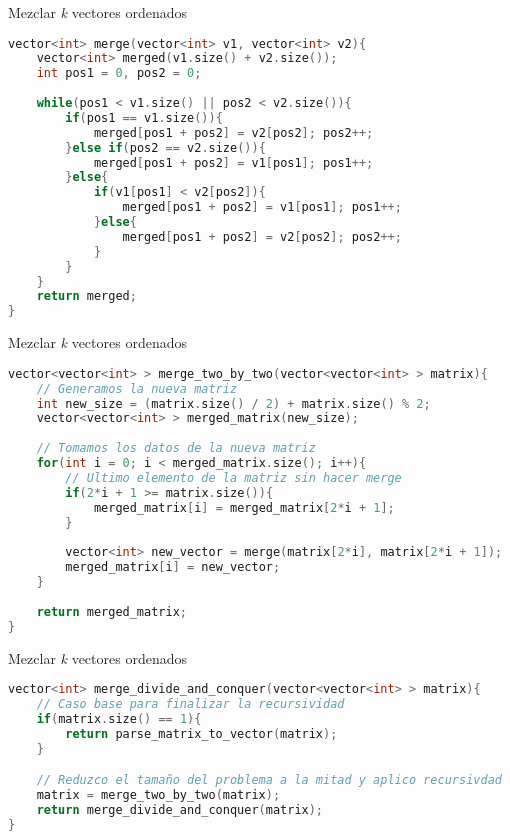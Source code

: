 \documentclass[10pt, xcolor=table]{beamer}
\begin{document}
\begin{frame}[fragile]{Mezclar \textit{k} vectores ordenados}
\begin{lstlisting}[language=C]
vector<int> merge(vector<int> v1, vector<int> v2){
	vector<int> merged(v1.size() + v2.size());
	int pos1 = 0, pos2 = 0;
	
	while(pos1 < v1.size() || pos2 < v2.size()){
		if(pos1 == v1.size()){
			merged[pos1 + pos2] = v2[pos2]; pos2++;
		}else if(pos2 == v2.size()){
			merged[pos1 + pos2] = v1[pos1];	pos1++;
		}else{
			if(v1[pos1] < v2[pos2]){
				merged[pos1 + pos2] = v1[pos1]; pos1++;
			}else{
				merged[pos1 + pos2] = v2[pos2]; pos2++;
			}
		}
	}
	return merged;
}

\end{lstlisting}
\end{frame}
\begin{frame}[fragile]{Mezclar \textit{k} vectores ordenados}
\begin{lstlisting}[language=C]
vector<vector<int> > merge_two_by_two(vector<vector<int> > matrix){
	// Generamos la nueva matriz
	int new_size = (matrix.size() / 2) + matrix.size() % 2;
	vector<vector<int> > merged_matrix(new_size);
	
	// Tomamos los datos de la nueva matriz
	for(int i = 0; i < merged_matrix.size(); i++){
		// Ultimo elemento de la matriz sin hacer merge
		if(2*i + 1 >= matrix.size()){
			merged_matrix[i] = merged_matrix[2*i + 1];
		}
	
		vector<int> new_vector = merge(matrix[2*i], matrix[2*i + 1]);
		merged_matrix[i] = new_vector;
	}
	
	return merged_matrix;
}


\end{lstlisting}
\end{frame}

\begin{frame}[fragile]{Mezclar \textit{k} vectores ordenados}
\begin{lstlisting}[language=C]
vector<int> merge_divide_and_conquer(vector<vector<int> > matrix){
	// Caso base para finalizar la recursividad
	if(matrix.size() == 1){
		return parse_matrix_to_vector(matrix);
	}

	// Reduzco el tamaño del problema a la mitad y aplico recursivdad
	matrix = merge_two_by_two(matrix);
	return merge_divide_and_conquer(matrix);
}

\end{lstlisting}
\end{frame}
\end{document}
